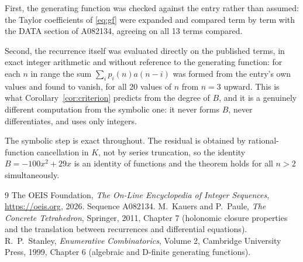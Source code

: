 \documentclass[11pt,a4paper]{article}
\theoremstyle{plain}
\theoremstyle{definition}
\begin{document}
First, the generating function was checked against the entry rather than assumed: the
Taylor coefficients of \eqref{eq:gf} were expanded and compared term by term with the DATA
section of A082134, agreeing on all 13 terms compared.

Second, the recurrence itself was evaluated directly on the published terms, in exact
integer arithmetic and without reference to the generating function: for each $n$ in range
the sum $\sum_{i}p_{i}(n)a(n-i)$ was formed from the entry's own values and found to
vanish, for all 20 values of $n$ from $n=3$ upward. This is what
Corollary~\ref{cor:criterion} predicts from the degree of $B$, and it is a genuinely
different computation from the symbolic one: it never forms $B$, never differentiates, and
uses only integers.

The symbolic step is exact throughout. The residual is obtained by rational-function
cancellation in $K$, not by series truncation, so the identity $B=- 100 x^{2} + 29 x$ is an
identity of functions and the theorem holds for all $n>2$ simultaneously.

\begin{thebibliography}{9}
 The OEIS Foundation, \emph{The On-Line Encyclopedia of Integer Sequences},
\url{https://oeis.org}, 2026. Sequence A082134.
 M.~Kauers and P.~Paule, \emph{The Concrete Tetrahedron}, Springer, 2011,
Chapter 7 (holonomic closure properties and the translation between recurrences and
differential equations).
 R.~P.~Stanley, \emph{Enumerative Combinatorics}, Volume 2, Cambridge
University Press, 1999, Chapter 6 (algebraic and D-finite generating functions).
\end{thebibliography}
\end{document}
